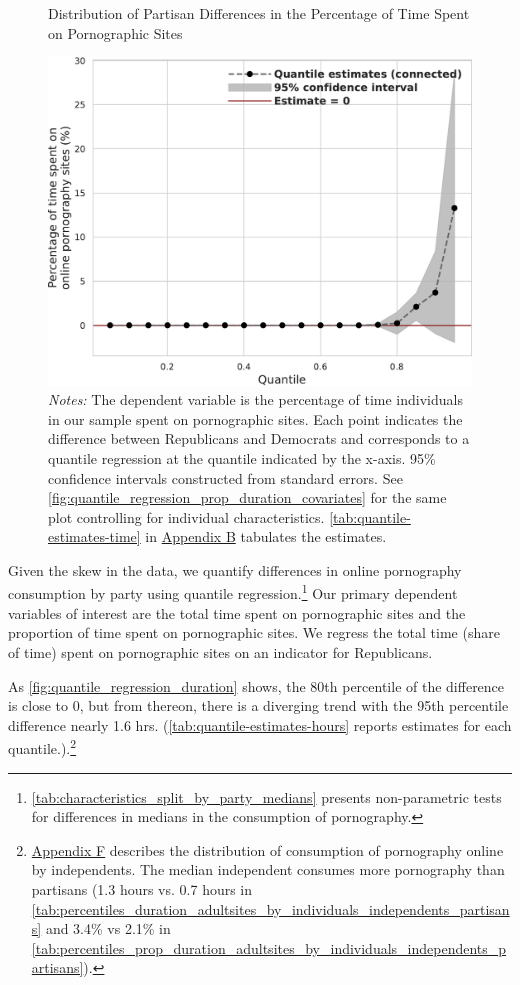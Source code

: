 \documentclass[12pt,twoside]{article}
\begin{document}
\begin{figure}[t]
	\centering
	\caption{Distribution of Partisan Differences in the Percentage of Time Spent on Pornographic Sites}
	\includegraphics[width=.7\linewidth]{figs/quantile_reg_proportion_duration_adult.pdf}
	\caption*{\footnotesize \emph{Notes:} 
		The dependent variable is the percentage of time individuals in our sample spent on pornographic sites.
		Each point indicates the difference between Republicans and Democrats and corresponds to a quantile regression at the quantile indicated by the x-axis.
		95\% confidence intervals constructed from standard errors.
		See \cref{fig:quantile_regression_prop_duration_covariates} for the same plot controlling for individual characteristics.
            \cref{tab:quantile-estimates-time} in \hyperref[sm:smB]{Appendix B} tabulates the estimates.
	}
	\label{fig:quantile_regression_prop_duration}
\end{figure}

Given the skew in the data, we quantify differences in online pornography consumption by party using quantile regression.\footnote{\cref{tab:characteristics_split_by_party_medians} presents non-parametric tests for differences in medians in the consumption of pornography.} Our primary dependent variables of interest are the total time spent on pornographic sites and the proportion of time spent on pornographic sites. We regress the total time (share of time) spent on pornographic sites on an indicator for Republicans. 

As \cref{fig:quantile_regression_duration} shows, the 80th percentile of the difference is close to 0, but from thereon, there is a diverging trend with the 95th percentile difference nearly 1.6 hrs. (\cref{tab:quantile-estimates-hours} reports estimates for each quantile.).\footnote{\hyperref[sm:smF]{Appendix F} describes the distribution of consumption of pornography online by independents. The median independent consumes more pornography than partisans (1.3 hours vs. 0.7 hours in \cref{tab:percentiles_duration_adultsites_by_individuals_independents_partisans} and 3.4\% vs 2.1\% in \cref{tab:percentiles_prop_duration_adultsites_by_individuals_independents_partisans}).}
\end{document}
